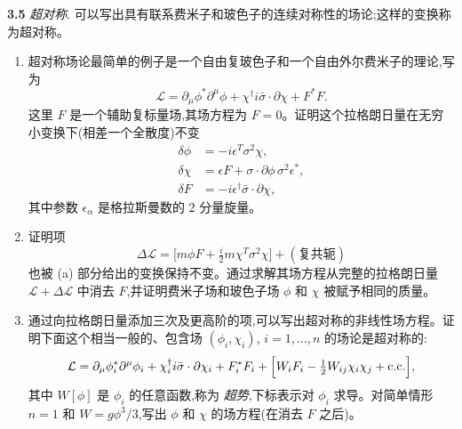 \textbf{3.5} \emph{超对称}.  可以写出具有联系费米子和玻色子的连续对称性的场论;这样的变换称为超对称。
\begin{enumerate}[label=(\alph*)]
  \item 超对称场论最简单的例子是一个自由复玻色子和一个自由外尔费米子的理论,写为
    \begin{equation}
      \mathcal{L} = \partial_\mu\phi^{*}\partial^\mu\phi
        + \chi^{\dagger}i\bar{\sigma}\cdot\partial\chi + F^{*}F .
    \end{equation}
    这里 $F$ 是一个辅助复标量场,其场方程为 $F = 0$。证明这个拉格朗日量在无穷小变换下(相差一个全散度)不变
    \begin{align}
      \delta\phi &= -i\epsilon^T\sigma^2\chi,\\
      \delta\chi &= \epsilon F + \sigma\cdot\partial\phi\,\sigma^2\epsilon^{*},\\
      \delta F &= -i\epsilon^{\dagger}\bar{\sigma}\cdot\partial\chi,
    \end{align}
    其中参数 $\epsilon_\alpha$ 是格拉斯曼数的 2 分量旋量。
  \item 证明项
    \begin{equation}
      \Delta\mathcal{L} = \bigl[ m\phi F + \tfrac{i}{2}m\chi^T\sigma^2\chi \bigr]
        + (\text{复共轭})
    \end{equation}
    也被 (a) 部分给出的变换保持不变。通过求解其场方程从完整的拉格朗日量 $\mathcal{L} +
    \Delta\mathcal{L}$ 中消去 $F$,并证明费米子场和玻色子场 $\phi$ 和 $\chi$ 被赋予相同的质量。
  \item 通过向拉格朗日量添加三次及更高阶的项,可以写出超对称的非线性场方程。证明下面这个相当一般的、包含场
    $(\phi_i, \chi_i)$, $i = 1, \ldots, n$ 的场论是超对称的:
    \begin{equation}
      \mathcal{L} = \partial_\mu\phi_i^{*}\partial^\mu\phi_i
        + \chi_i^{\dagger}i\bar{\sigma}\cdot\partial\chi_i + F_i^{*}F_i
        + \Bigl[ W_i F_i - \tfrac{1}{2}W_{ij}\chi_i\chi_j + \text{c.c.}
          \Bigr],
    \end{equation}
    其中 $W[\phi]$ 是 $\phi_i$ 的任意函数,称为
    \emph{超势},下标表示对 $\phi_i$ 求导。对简单情形 $n = 1$ 和 $W = g\phi^3/3$,写出 $\phi$ 和 $\chi$ 的场方程(在消去 $F$ 之后)。
\end{enumerate}

